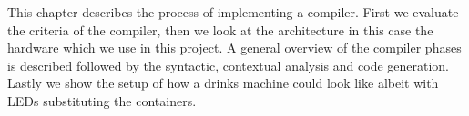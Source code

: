 This chapter describes the process of implementing a compiler. First we evaluate the criteria of the compiler, then we look at the architecture in this case the hardware which we use in this project. A general overview of the compiler phases is described followed by the syntactic, contextual analysis and code generation. Lastly we show the setup of how a drinks machine could look like albeit with LEDs substituting the containers.
